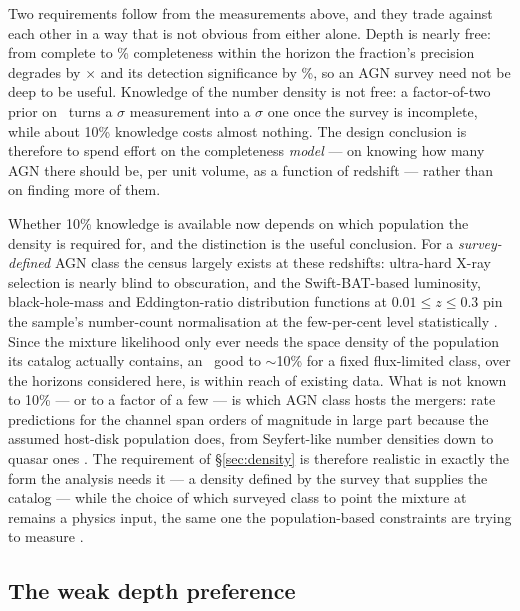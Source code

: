 Two requirements follow from the measurements above, and they trade against each
other in a way that is not obvious from either alone. Depth is nearly free: from
complete to \IncMeighteenCPct\% completeness within the horizon the fraction's
precision degrades by \IncFacFMax$\times$ and its detection significance by
\IncSepLoss\%, so an AGN survey need not be deep to be useful. Knowledge of the
number density is not free: a factor-of-two prior on \nzagn\ turns a
\FreeCompleteExactSig$\sigma$ measurement into a
\FreeMeighteenFtwoSig$\sigma$ one once the survey is incomplete, while about
10\% knowledge costs almost nothing. The design conclusion is therefore to spend
effort on the completeness \emph{model} --- on knowing how many AGN there should
be, per unit volume, as a function of redshift --- rather than on finding more of
them.

Whether 10\% knowledge is available now depends on which population the
density is required for, and the distinction is the useful conclusion. For a
\emph{survey-defined} AGN class the census largely exists at these redshifts:
ultra-hard X-ray selection is nearly blind to obscuration, and the
Swift-BAT-based luminosity, black-hole-mass and Eddington-ratio distribution
functions at $0.01 \le z \le 0.3$ pin the sample's number-count normalisation
at the few-per-cent level statistically \citep{Ananna2022}. Since the mixture
likelihood only ever needs the space density of the population its catalog
actually contains, an \nzagn\ good to $\sim$10\% for a fixed flux-limited
class, over the horizons considered here, is within reach of existing data.
What is not known to 10\% --- or to a factor of a few --- is which AGN class
hosts the mergers: rate predictions for the channel span orders of magnitude
in large part because the assumed host-disk population does, from
Seyfert-like number densities down to quasar ones \citep{McKernan2018}. The
requirement of \S\ref{sec:density} is therefore realistic in exactly the form
the analysis needs it --- a density defined by the survey that supplies the
catalog --- while the choice of which surveyed class to point the mixture at
remains a physics input, the same one the population-based constraints are
trying to measure \citep{Gayathri2021, FordMcKernan2022}.

\subsection{The weak depth preference}
\label{sec:disc:depth}

